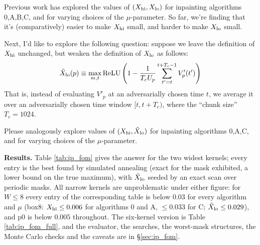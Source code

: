 \documentclass{article}
\numberwithin{equation}{section}   %
\begin{document}
Previous work has explored the values of $(X_{\rm hi}, X_{\rm lo})$ for inpainting algorithms 0,A,B,C, and for varying choices of the $\mu$-parameter. So far, we're finding that it's (comparatively) easier to make $X_{\rm hi}$ small, and harder to make $X_{\rm lo}$ small. 

Next, I'd like to explore the following question: suppose we leave the definition of $X_{\rm hi}$ unchanged, but weaken the definition of $X_{\rm lo}$ as follows:
\begin{equation}
\tilde X_{\rm lo}(p) \equiv \max_{m,t} \mbox{ReLU} \left( 1 - \frac{1}{T_cU_p} \sum_{t'=t}^{t+T_c-1} V'_p(t') \right)
\end{equation}
That is, instead of evaluating $V'_p$ at an adversarially chosen time $t$, we average it over an adversarially chosen time window $[t,t+T_c)$, where the ``chunk size'' $T_c=1024$.

Please analogously explore values of $(X_{\rm hi}, \tilde X_{\rm lo})$ for inpainting algorithms 0,A,C, and for varying choices of the $\mu$-parameter.

{\bf Results.}  Table \ref{tab:ip_fom} gives the answer for the two widest kernels; every
entry is the best found by simulated annealing (exact for the mask exhibited, a lower bound on the true
maximum), with $\tilde X_{\rm lo}$ seeded by an exact scan over periodic masks.  All narrow kernels are
unproblematic under either figure: for $W \le 8$ every entry of the corresponding table is below $0.03$
for every algorithm and $\mu$ (box8: $X_{\rm hi} \le 0.006$ for algorithms 0 and A, $\le 0.033$ for C;
$\tilde X_{\rm lo} \le 0.029$), and p0 is below $0.005$ throughout.  The six-kernel version is Table
\ref{tab:ip_fom_full}, and the evaluator, the searches, the worst-mask structures, the Monte Carlo checks
and the caveats are in \S\ref{sec:ip_fom}.
\end{document}
